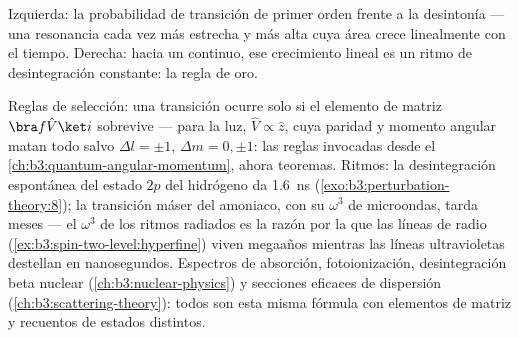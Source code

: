 \begin{omfigure}

{\small Izquierda: la probabilidad de transición de primer orden frente a la
desintonía --- una resonancia cada vez más estrecha y más alta cuya área
crece linealmente con el tiempo. Derecha: hacia un continuo, ese crecimiento
lineal es un ritmo de desintegración constante: la regla de oro.}
\end{omfigure}

\begin{example}\label{ex:b3:perturbation-theory:applications}
Reglas de selección: una transición ocurre solo si el elemento de matriz
$\bra f\hat V\ket i$ sobrevive --- para la luz, $\hat V \propto \hat
z$, cuya paridad y momento angular matan todo salvo
$\Delta l = \pm1$, $\Delta m = 0, \pm1$: las reglas invocadas desde el
\cref{ch:b3:quantum-angular-momentum}, ahora teoremas. Ritmos: la
desintegración espontánea del estado $2p$ del hidrógeno da
\qty{1.6}{ns} (\cref{exo:b3:perturbation-theory:8}); la transición máser
del amoniaco, con su $\omega^3$ de microondas, tarda meses ---
el $\omega^3$ de los ritmos radiados es la razón por la que las líneas de
radio (\cref{ex:b3:spin-two-level:hyperfine}) viven megaaños mientras las
líneas ultravioletas destellan en nanosegundos. Espectros de absorción,
fotoionización, desintegración beta nuclear
(\cref{ch:b3:nuclear-physics}) y secciones eficaces de dispersión
(\cref{ch:b3:scattering-theory}): todos son esta misma fórmula con
elementos de matriz y recuentos de estados distintos.
\end{example}

